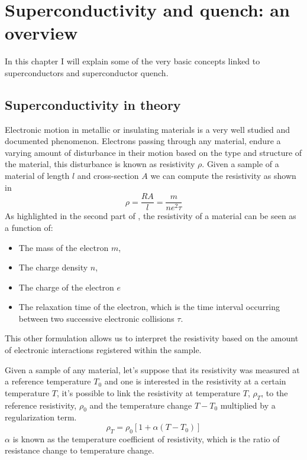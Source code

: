\chapter{Superconductivity and quench: an overview}
\label{chp:soupcond-quench}
In this chapter I will explain some of the very basic concepts linked to superconductors and
superconductor quench.
\section{Superconductivity in theory}
\label{sec:soupcond}
Electronic motion in metallic or insulating materials is a very well studied and documented
phenomenon. Electrons passing through any material, endure a varying amount of disturbance in their
motion based on the type and structure of the material, this disturbance is known as resistivity $\rho$.
Given a sample of a material of length $l$ and cross-section $A$ we can compute the resistivity as
shown in 
\begin{equation}
	\label{eq:resistivity-cable}
	\rho = \frac{RA}{l} = \frac{m}{ne^2\tau}
\end{equation}
As highlighted in the second part of , the resistivity of a
material can be seen as a function of:
\begin{itemize}
	\item The mass of the electron $m$,
	\item The charge density $n$,
	\item The charge of the electron $e$
	\item The relaxation time of the electron, which is the time interval occurring between two
	      successive electronic collisions $\tau$.
\end{itemize}
This other formulation allows us to interpret the resistivity based on the amount of electronic
interactions registered within the sample.

\medskip

Given a sample of any material, let's suppose that its resistivity was measured at a reference
temperature $T_0$ and one is interested in the resistivity at a certain temperature $T$, it's
possible to link the resistivity at temperature $T$, $\rho_T$, to the reference resistivity,
$\rho_0$ and the temperature change $T - T_0$ multiplied by a regularization term.
\begin{equation}
	\label{eq:resistivity-func-of-temp}
	\rho_T = \rho_0[1 + \alpha(T - T_0)]
\end{equation}
$\alpha$ is known as the temperature coefficient of resistivity, which is the ratio of resistance change to temperature change.

